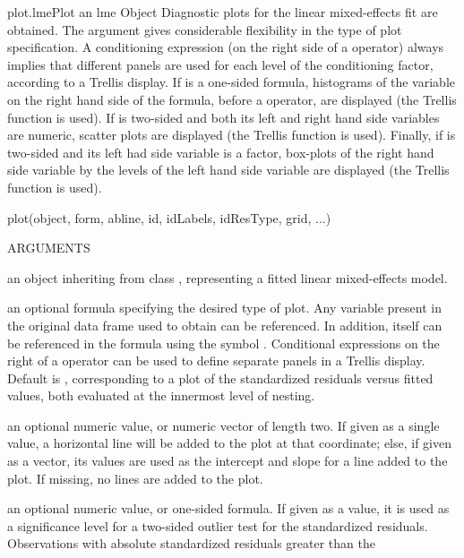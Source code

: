 \documentclass[pdftex]{article} \usepackage{url,graphicx}
\renewcommand{\Twiddle}{\mbox{\(\sim\)}}
\begin{document}
\begin{Helpfile}{plot.lme}{Plot an lme Object}
Diagnostic plots for the linear mixed-effects fit are obtained. The
 argument gives considerable flexibility in the type of
plot specification. A conditioning expression (on the right side of a
\Co{|} operator) always implies that different panels are used for
each level of the conditioning factor, according to a Trellis
display. If  is a one-sided formula, histograms of the
variable on the right hand side of the formula, before a \Co{|}
operator, are displayed (the Trellis function  is
used). If  is two-sided and both its left and
right hand side variables are numeric, scatter plots are displayed
(the Trellis function  is used). Finally, if 
is two-sided and its left had side variable is a factor, box-plots of
the right hand side variable by the levels of the left hand side
variable are displayed (the Trellis function   is used).
\begin{Example}
plot(object, form, abline, id, idLabels, idResType, grid, ...)
\end{Example}
\begin{Argument}{ARGUMENTS}
\item[\Co{object:}]
an object inheriting from class , representing
a fitted linear mixed-effects model.
\item[\Co{form:}]
an optional formula specifying the desired type of
plot. Any variable present in the original data frame used to obtain
 can be referenced. In addition,  itself
can be referenced in the formula using the symbol
. Conditional expressions on the right of a \Co{|}
operator can be used to define separate panels in a Trellis
display. Default is \Co{resid(., type = "p") \Twiddle fitted(.) },
corresponding to a plot of the standardized residuals versus fitted
values, both evaluated at the innermost level of nesting.
\item[\Co{abline:}]
an optional numeric value, or numeric vector of length
two. If given as a single value, a horizontal line will be added to the
plot at that coordinate; else, if given as a vector, its values are
used as the intercept and slope for a line added to the plot. If
missing, no lines are added to the plot.
\item[\Co{id:}]
an optional numeric value, or one-sided formula. If given as
a value, it is used as a significance level for a two-sided outlier
test for the standardized residuals. Observations with
absolute standardized residuals greater than the 

\end{Argument}
\end{Helpfile}
\end{document}

